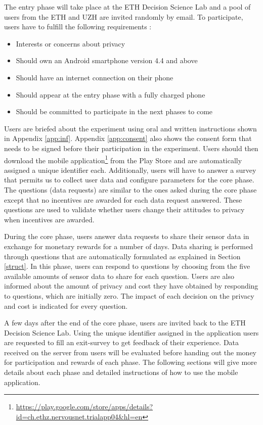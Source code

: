 The entry phase will take place at the ETH Decision Science Lab and a pool of users from the ETH and UZH are invited randomly by email. To participate, users have to fulfill the following requirements \cite{pournarasethical}:

\begin{itemize}
\item Interests or concerns about privacy
\item Should own an Android smartphone version 4.4 and above
\item Should have an internet connection on their phone
\item Should appear at the entry phase with a fully charged phone
\item Should be committed to participate in the next phases to come
\end{itemize}

Users are briefed about the experiment using oral and written instructions shown in Appendix \ref{app:inf}. Appendix \ref{app:consent} also shows the consent form that needs to be signed before their participation in the experiment. Users should then download the mobile application\footnote{\url{https://play.google.com/store/apps/details?id=ch.ethz.nervousnet.trialapp04&hl=en}} from the Play Store and are automatically assigned a unique identifier each. Additionally, users will have to answer a survey that permits us to collect user data and configure parameters for the core phase. The questions (data requests) are similar to the ones asked during the core phase except that no incentives are awarded for each data request answered. These questions are used to validate whether users change their attitudes to privacy when incentives are awarded.

During the core phase, users answer data requests to share their sensor data in exchange for monetary rewards for a number of days. Data sharing is performed through questions that are automatically formulated as explained in Section \ref{struct}. In this phase, users can respond to questions by choosing from the five available amounts of sensor data to share for each question. Users are also informed about the amount of privacy and cost they have obtained by responding to questions, which are initially zero. The impact of each decision on the privacy and cost is indicated for every question.

A few days after the end of the core phase, users are invited back to the ETH Decision Science Lab. Using the unique identifier assigned in the application users are requested to fill an exit-survey to get feedback of their experience. Data received on the server from users will be evaluated before handing out the money for participation and rewards of each phase. The following sections will give more details about each phase and detailed instructions of how to use the mobile application.

